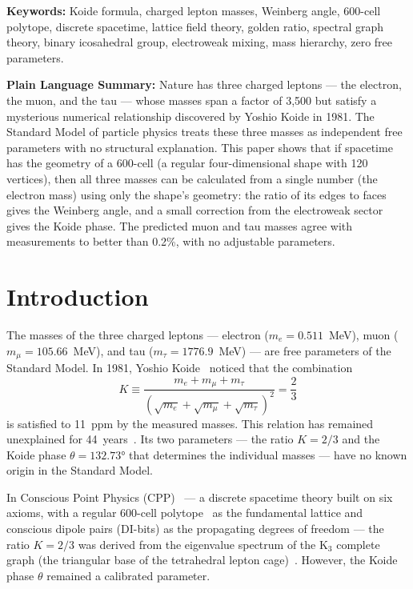 \documentclass[11pt,letterpaper]{article}
\begin{document}
\medskip\noindent\textbf{Keywords:} Koide formula, charged lepton masses, Weinberg angle, 600-cell polytope, discrete spacetime, lattice field theory, golden ratio, spectral graph theory, binary icosahedral group, electroweak mixing, mass hierarchy, zero free parameters.

\bigskip\noindent
\textbf{Plain Language Summary:}
Nature has three charged leptons --- the electron, the muon, and the tau --- whose masses span a factor of 3,500 but satisfy a mysterious numerical relationship discovered by Yoshio Koide in 1981. The Standard Model of particle physics treats these three masses as independent free parameters with no structural explanation. This paper shows that if spacetime has the geometry of a 600-cell (a regular four-dimensional shape with 120 vertices), then all three masses can be calculated from a single number (the electron mass) using only the shape's geometry: the ratio of its edges to faces gives the Weinberg angle, and a small correction from the electroweak sector gives the Koide phase. The predicted muon and tau masses agree with measurements to better than 0.2\%, with no adjustable parameters.

\bigskip
\raggedright
\tableofcontents
\newpage

\section{Introduction}
The masses of the three charged leptons --- electron ($m_e = 0.511$~MeV), muon ($m_\mu = 105.66$~MeV), and tau ($m_\tau = 1776.9$~MeV) --- are free parameters of the Standard Model. In 1981, Yoshio Koide~\citep{koide1983} noticed that the combination
\begin{equation}
K \equiv \frac{m_e + m_\mu + m_\tau}{(\sqrt{m_e} + \sqrt{m_\mu} + \sqrt{m_\tau})^2} = \frac{2}{3}
\label{eq:koide}
\end{equation}
is satisfied to 11~ppm by the measured masses. This relation has remained unexplained for 44~years~\citep{foot1994,rivero2005}. Its two parameters --- the ratio $K = 2/3$ and the Koide phase $\theta = 132.73°$ that determines the individual masses --- have no known origin in the Standard Model.

In Conscious Point Physics (CPP)~\citep{abshier2026sm1,abshier2026sm3,abshier2026ss1} --- a discrete spacetime theory built on six axioms, with a regular 600-cell polytope~\citep{coxeter1973} as the fundamental lattice and conscious dipole pairs (DI-bits) as the propagating degrees of freedom --- the ratio $K = 2/3$ was derived from the eigenvalue spectrum of the K$_3$ complete graph (the triangular base of the tetrahedral lepton cage)~\citep{abshier2026sm3}. However, the Koide phase $\theta$ remained a calibrated parameter.
\end{document}
